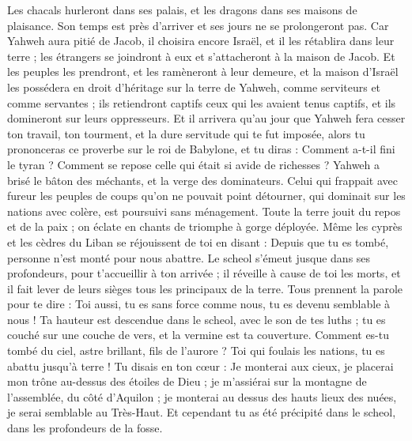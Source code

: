 \begin{multicols}{2}
Les chacals hurleront dans ses palais, et les dragons dans ses maisons de plaisance. Son temps est près d'arriver et ses jours ne se prolongeront pas.
\VerseOne{}Car Yahweh aura pitié de Jacob, il choisira encore Israël, et il les rétablira dans leur terre ; les étrangers se joindront à eux et s'attacheront à la maison de Jacob.
Et les peuples les prendront, et les ramèneront à leur demeure, et la maison d'Israël les possédera en droit d'héritage sur la terre de Yahweh, comme serviteurs et comme servantes ; ils retiendront captifs ceux qui les avaient tenus captifs, et ils domineront sur leurs oppresseurs.
Et il arrivera qu'au jour que Yahweh fera cesser ton travail, ton tourment, et la dure servitude qui te fut imposée,
alors tu prononceras ce proverbe sur le roi de Babylone, et tu diras : Comment a-t-il fini le tyran ? Comment se repose celle qui était si avide de richesses ?
Yahweh a brisé le bâton des méchants, et la verge des dominateurs.
Celui qui frappait avec fureur les peuples de coups qu'on ne pouvait point détourner, qui dominait sur les nations avec colère, est poursuivi sans ménagement.
Toute la terre jouit du repos et de la paix ; on éclate en chants de triomphe à gorge déployée.
Même les cyprès et les cèdres du Liban se réjouissent de toi en disant : Depuis que tu es tombé, personne n'est monté pour nous abattre.
Le scheol s'émeut jusque dans ses profondeurs, pour t'accueillir à ton arrivée ; il réveille à cause de toi les morts, et il fait lever de leurs sièges tous les principaux de la terre.
Tous prennent la parole pour te dire : Toi aussi, tu es sans force comme nous, tu es devenu semblable à nous !
Ta hauteur est descendue dans le scheol, avec le son de tes luths ; tu es couché sur une couche de vers, et la vermine est ta couverture.
Comment es-tu tombé du ciel, astre brillant, fils de l'aurore ? Toi qui foulais les nations, tu es abattu jusqu'à terre !
Tu disais en ton cœur : Je monterai aux cieux, je placerai mon trône au-dessus des étoiles de Dieu ; je m'assiérai sur la montagne de l'assemblée, du côté d'Aquilon ;
je monterai au dessus des hauts lieux des nuées, je serai semblable au Très-Haut.
Et cependant tu as été précipité dans le scheol, dans les profondeurs de la fosse.

\end{multicols}
